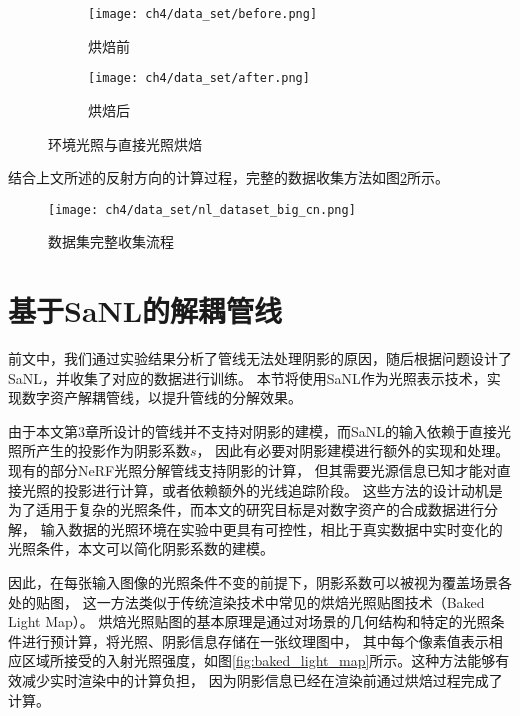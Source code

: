 \begin{figure}[H]
  \centering
  \begin{subfigure}[t]{0.42\textwidth}
    \centering
    \texttt{[image: ch4/data\_set/before.png]}
    \caption{烘焙前}
  \end{subfigure}
  \begin{subfigure}[t]{0.42\textwidth}
    \centering
    \texttt{[image: ch4/data\_set/after.png]}
    \caption{烘焙后}
  \end{subfigure}
  \caption{环境光照与直接光照烘焙}
  \label{fig:light_baking}
\end{figure}
结合上文所述的反射方向的计算过程，完整的数据收集方法如图\ref{fig:full_pipe}所示。
\begin{figure}[htb]
  \centering
  \texttt{[image: ch4/data\_set/nl\_dataset\_big\_cn.png]}
  \caption{数据集完整收集流程}
  \label{fig:full_pipe}
\end{figure}

\section{基于SaNL的解耦管线}

前文中，我们通过实验结果分析了管线无法处理阴影的原因，随后根据问题设计了SaNL，并收集了对应的数据进行训练。
本节将使用SaNL作为光照表示技术，实现数字资产解耦管线，以提升管线的分解效果。

由于本文第3章所设计的管线并不支持对阴影的建模，而SaNL的输入依赖于直接光照所产生的投影作为阴影系数$s$，
因此有必要对阴影建模进行额外的实现和处理。现有的部分NeRF光照分解管线支持阴影的计算，
但其需要光源信息已知才能对直接光照的投影进行计算，或者依赖额外的光线追踪阶段。
这些方法的设计动机是为了适用于复杂的光照条件，而本文的研究目标是对数字资产的合成数据进行分解，
输入数据的光照环境在实验中更具有可控性，相比于真实数据中实时变化的光照条件，本文可以简化阴影系数的建模。

因此，在每张输入图像的光照条件不变的前提下，阴影系数可以被视为覆盖场景各处的贴图，
这一方法类似于传统渲染技术中常见的烘焙光照贴图技术（Baked Light Map）。
烘焙光照贴图的基本原理是通过对场景的几何结构和特定的光照条件进行预计算，将光照、阴影信息存储在一张纹理图中，
其中每个像素值表示相应区域所接受的入射光照强度，如图\ref{fig:baked_light_map}所示。这种方法能够有效减少实时渲染中的计算负担，
因为阴影信息已经在渲染前通过烘焙过程完成了计算。

